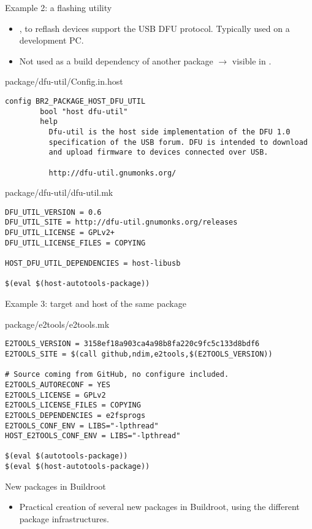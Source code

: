 \begin{frame}[fragile]{Example 2: a flashing utility}

  \begin{itemize}
  \item {}, to reflash devices support the USB DFU
    protocol. Typically used on a development PC.
  \item Not used as a build dependency of another package
    $\rightarrow$ visible in .
  \end{itemize}
  \begin{block}{package/dfu-util/Config.in.host}
    \tiny
\begin{verbatim}
config BR2_PACKAGE_HOST_DFU_UTIL
        bool "host dfu-util"
        help
          Dfu-util is the host side implementation of the DFU 1.0
          specification of the USB forum. DFU is intended to download
          and upload firmware to devices connected over USB.

          http://dfu-util.gnumonks.org/
\end{verbatim}
  \end{block}

  \begin{block}{package/dfu-util/dfu-util.mk}
    \begin{verbatim}
DFU_UTIL_VERSION = 0.6
DFU_UTIL_SITE = http://dfu-util.gnumonks.org/releases
DFU_UTIL_LICENSE = GPLv2+
DFU_UTIL_LICENSE_FILES = COPYING

HOST_DFU_UTIL_DEPENDENCIES = host-libusb

$(eval $(host-autotools-package))
    \end{verbatim}
  \end{block}
\end{frame}

\begin{frame}[fragile]{Example 3: target and host of the same package}
  \begin{block}{package/e2tools/e2tools.mk}
    \begin{verbatim}
E2TOOLS_VERSION = 3158ef18a903ca4a98b8fa220c9fc5c133d8bdf6
E2TOOLS_SITE = $(call github,ndim,e2tools,$(E2TOOLS_VERSION))

# Source coming from GitHub, no configure included.
E2TOOLS_AUTORECONF = YES
E2TOOLS_LICENSE = GPLv2
E2TOOLS_LICENSE_FILES = COPYING
E2TOOLS_DEPENDENCIES = e2fsprogs
E2TOOLS_CONF_ENV = LIBS="-lpthread"
HOST_E2TOOLS_CONF_ENV = LIBS="-lpthread"

$(eval $(autotools-package))
$(eval $(host-autotools-package))
    \end{verbatim}
  \end{block}
\end{frame}

\setuplabframe
{New packages in Buildroot}
{
  \begin{itemize}
  \item Practical creation of several new packages in Buildroot, using
    the different package infrastructures.
  \end{itemize}
}

